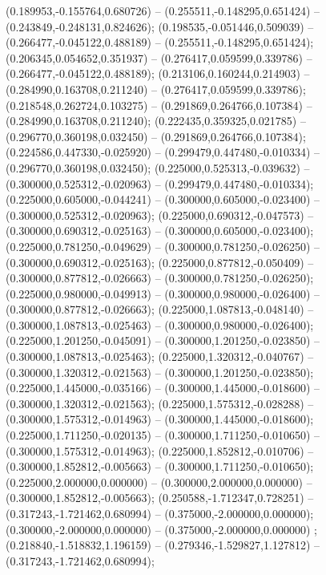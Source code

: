  (0.189953,-0.155764,0.680726) -- (0.255511,-0.148295,0.651424) -- (0.243849,-0.248131,0.824626);
 (0.198535,-0.051446,0.509039) -- (0.266477,-0.045122,0.488189) -- (0.255511,-0.148295,0.651424);
 (0.206345,0.054652,0.351937) -- (0.276417,0.059599,0.339786) -- (0.266477,-0.045122,0.488189);
 (0.213106,0.160244,0.214903) -- (0.284990,0.163708,0.211240) -- (0.276417,0.059599,0.339786);
 (0.218548,0.262724,0.103275) -- (0.291869,0.264766,0.107384) -- (0.284990,0.163708,0.211240);
 (0.222435,0.359325,0.021785) -- (0.296770,0.360198,0.032450) -- (0.291869,0.264766,0.107384);
 (0.224586,0.447330,-0.025920) -- (0.299479,0.447480,-0.010334) -- (0.296770,0.360198,0.032450);
 (0.225000,0.525313,-0.039632) -- (0.300000,0.525312,-0.020963) -- (0.299479,0.447480,-0.010334);
 (0.225000,0.605000,-0.044241) -- (0.300000,0.605000,-0.023400) -- (0.300000,0.525312,-0.020963);
 (0.225000,0.690312,-0.047573) -- (0.300000,0.690312,-0.025163) -- (0.300000,0.605000,-0.023400);
 (0.225000,0.781250,-0.049629) -- (0.300000,0.781250,-0.026250) -- (0.300000,0.690312,-0.025163);
 (0.225000,0.877812,-0.050409) -- (0.300000,0.877812,-0.026663) -- (0.300000,0.781250,-0.026250);
 (0.225000,0.980000,-0.049913) -- (0.300000,0.980000,-0.026400) -- (0.300000,0.877812,-0.026663);
 (0.225000,1.087813,-0.048140) -- (0.300000,1.087813,-0.025463) -- (0.300000,0.980000,-0.026400);
 (0.225000,1.201250,-0.045091) -- (0.300000,1.201250,-0.023850) -- (0.300000,1.087813,-0.025463);
 (0.225000,1.320312,-0.040767) -- (0.300000,1.320312,-0.021563) -- (0.300000,1.201250,-0.023850);
 (0.225000,1.445000,-0.035166) -- (0.300000,1.445000,-0.018600) -- (0.300000,1.320312,-0.021563);
 (0.225000,1.575312,-0.028288) -- (0.300000,1.575312,-0.014963) -- (0.300000,1.445000,-0.018600);
 (0.225000,1.711250,-0.020135) -- (0.300000,1.711250,-0.010650) -- (0.300000,1.575312,-0.014963);
 (0.225000,1.852812,-0.010706) -- (0.300000,1.852812,-0.005663) -- (0.300000,1.711250,-0.010650);
 (0.225000,2.000000,0.000000) -- (0.300000,2.000000,0.000000) -- (0.300000,1.852812,-0.005663);
 (0.250588,-1.712347,0.728251) -- (0.317243,-1.721462,0.680994) -- (0.375000,-2.000000,0.000000);
 (0.300000,-2.000000,0.000000) -- (0.375000,-2.000000,0.000000) ;
 (0.218840,-1.518832,1.196159) -- (0.279346,-1.529827,1.127812) -- (0.317243,-1.721462,0.680994);
